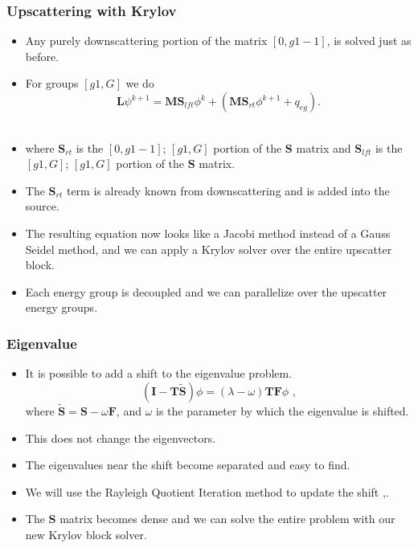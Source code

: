 \documentclass{beamer}
\begin{document}
\begin{frame}
  \frametitle{Upscattering with Krylov}
  
  \begin{itemize}
    \item Any purely downscattering portion of the matrix $[0, g1-1]$, is solved just as before. \\
    \item For groups $[g1,  G]$ we do \\    
    \begin{equation}
      \mathbf{L}\psi^{k+1} = \mathbf{MS}_{lft}\phi^{k} + (\mathbf{MS}_{rt}\phi^{k+1} + q_{eg}).
    \end{equation} \\
    \item where $\mathbf{S}_{rt}$ is the $[0, g1-1]$; $[g1, G]$ portion of the $\mathbf{S}$ matrix and $\mathbf{S}_{lft}$ is the $[g1, G]$; $[g1, G]$ portion of the $\mathbf{S}$ matrix.
    \item The $\mathbf{S}_{rt}$ term is already known from downscattering and is added into the source. 
    \item The resulting equation now looks like a Jacobi method instead of a Gauss Seidel method, and we can apply a Krylov solver over the entire upscatter block. 
    \item Each energy group is decoupled and we can parallelize over the upscatter energy groups. 
\end{itemize}
  
\end{frame}
 
\begin{frame}
  \frametitle{Eigenvalue}
  
  \begin{itemize}
    \item It is possible to add a shift to the eigenvalue problem. \\
    \begin{equation}
      (\mathbf{I} - \mathbf{T\tilde{S}}) \phi = (\lambda - \omega) \mathbf{TF}\phi \text{ ,}
    \end{equation}
    where $\mathbf{\tilde{S}} = \mathbf{S} - \omega\mathbf{F}$, and $\omega$ is the parameter by which the eigenvalue is shifted. \\
    \item This does not change the eigenvectors. 
    \item The eigenvalues near the shift become separated and easy to find. 
    \item We will use the Rayleigh Quotient Iteration method to update the shift \cite{dcs},\cite{rqi}.
    \item The $\mathbf{S}$ matrix becomes dense and we can solve the entire problem with our new Krylov block solver.
  \end{itemize}
  
\end{frame}
\end{document}
